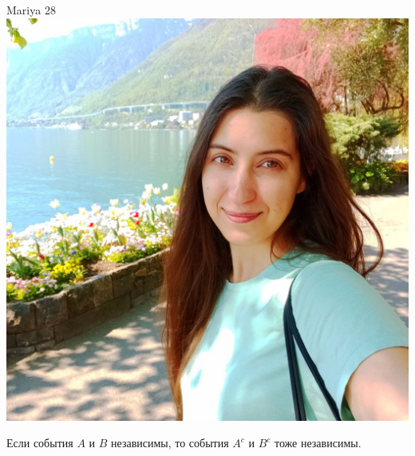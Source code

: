 \documentclass[12pt]{article}
\begin{document}
\begin{minipage}{0.45\textwidth}
\begin{tinderf}{Mariya 28}
\includegraphics[width=\textwidth]{tinder-photo/mariya.jpg}

  

\begin{mybox}
Если события  $A$ и $B$ независимы, то события $A^c$ и $B^c$ тоже независимы.
\end{mybox}
\end{tinderf}
\end{minipage}
\end{document}
